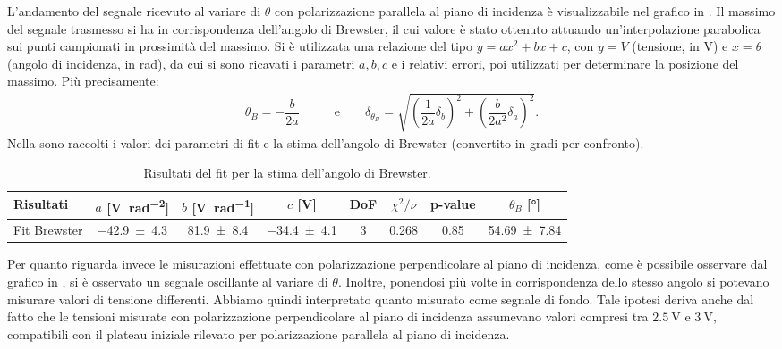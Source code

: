 \documentclass[a4paper]{article}
\begin{document}
L'andamento del segnale ricevuto al variare di $\theta$ con polarizzazione parallela al piano di incidenza è visualizzabile nel grafico in . Il massimo del segnale trasmesso si ha in corrispondenza dell'angolo di Brewster, il cui valore è stato ottenuto attuando un'interpolazione parabolica sui punti campionati in prossimità del massimo. Si è utilizzata una relazione del tipo $y = ax^2 + bx +c$, con $y=V$ (tensione, in \si{\volt}) e $x=\theta$ (angolo di incidenza, in \si{\radian}), da cui si sono ricavati i parametri $a, b, c$ e i relativi errori, poi utilizzati per determinare la posizione del massimo. Più precisamente:
\begin{align}
  \theta_{B} = -\dfrac{b}{2a} \qquad & \text{e}\qquad
  \delta_{\theta_{B}} = \sqrt{\left(\dfrac{1}{2a}\delta_b\right)^2 + \left(\dfrac{b}{2a^2}\delta_a\right)^2}. \label{eq:angolo_brewster_calc}
\end{align}
Nella  sono raccolti i valori dei parametri di fit e la stima dell'angolo di Brewster (convertito in gradi per confronto).
\begin{table}[htbp]
\centering
\caption{Risultati del fit per la stima dell'angolo di Brewster.}
\label{tab:fit_brewster}
\begin{tabular}{|l|ccccccc|}
\hline
Risultati & $a$ [\si{\volt\per\radian\squared}]& $b$ [\si{\volt\per\radian}]& $c$ [\si{\volt}]& DoF & $\chi^2/\nu$ & p-value & $\theta_B$ [\si{\degree}]\\\hline\hline
Fit Brewster & \num{-42.9 \pm 4.3} & \num{81.9 \pm 8.4} & \num{-34.4 \pm 4.1} & 3 & 0.268 & 0.85 & \num{54.69 \pm 7.84} \\\hline
\end{tabular}
\end{table}
Per quanto riguarda invece le misurazioni effettuate con polarizzazione perpendicolare al piano di incidenza, come è possibile osservare dal grafico in , si è osservato un segnale oscillante al variare di $\theta$. Inoltre, ponendosi più volte in corrispondenza dello stesso angolo si potevano misurare valori di tensione differenti. Abbiamo quindi interpretato quanto misurato come segnale di fondo. Tale ipotesi deriva anche dal fatto che le tensioni misurate con polarizzazione perpendicolare al piano di incidenza assumevano valori compresi tra $\SI{2.5}{\volt}$ e $\SI{3}{\volt}$, compatibili con il plateau iniziale rilevato per polarizzazione parallela al piano di incidenza.
\end{document}
